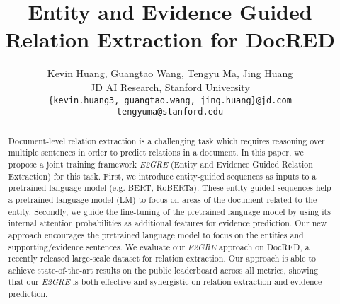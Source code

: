 \documentclass[11pt,a4paper]{article}
\title{Entity and Evidence Guided Relation Extraction for DocRED}
\author{Kevin Huang, Guangtao Wang, Tengyu Ma, Jing Huang \\
JD AI Research, Stanford University \\
\texttt{\{kevin.huang3, guangtao.wang, jing.huang\}@jd.com}\\ \texttt{tengyuma@stanford.edu}}
\date{}
\begin{document}
\maketitle
\begin{abstract}


Document-level relation extraction is a challenging task which requires reasoning over multiple sentences in order to predict relations in a document. 
In this paper, we propose a joint training framework {\em E2GRE} (Entity and Evidence Guided Relation Extraction) for this task.
First, we introduce entity-guided sequences as inputs to a pretrained language model (e.g. BERT, RoBERTa).
These entity-guided sequences help a pretrained language model (LM) to focus on areas of the document related to the entity.
Secondly, we guide the fine-tuning of the pretrained language model by using its internal attention probabilities as additional features for evidence prediction.
Our new approach encourages the pretrained language model to focus on the entities and supporting/evidence sentences. 
We evaluate our {\em E2GRE} approach on DocRED, a recently released large-scale dataset for relation extraction. 
Our approach is able to achieve state-of-the-art results on the public leaderboard across all metrics, showing that our {\em E2GRE} is both effective and synergistic on relation extraction and evidence prediction.

\end{abstract}
\end{document}
